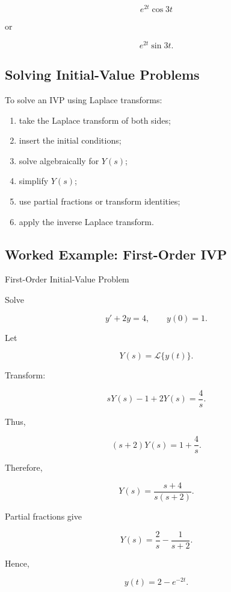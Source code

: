 \[
e^{2t}\cos3t
\]

or

\[
e^{2t}\sin3t.
\]

\subsection{Solving Initial-Value Problems}
\label{subsec:laplace-solving-ivps}

To solve an IVP using Laplace transforms:

\begin{enumerate}
    \item take the Laplace transform of both sides;
    \item insert the initial conditions;
    \item solve algebraically for \(Y(s)\);
    \item simplify \(Y(s)\);
    \item use partial fractions or transform identities;
    \item apply the inverse Laplace transform.
\end{enumerate}

\subsection{Worked Example: First-Order IVP}
\label{subsec:worked-laplace-first-order-ivp}

\begin{workedexamplebox}{First-Order Initial-Value Problem}

Solve

\[
y'+2y=4,
\qquad
y(0)=1.
\]

Let

\[
Y(s)
=
\mathcal{L}\{y(t)\}.
\]

Transform:

\[
sY(s)-1
+
2Y(s)
=
\frac4s.
\]

Thus,

\[
(s+2)Y(s)
=
1+\frac4s.
\]

Therefore,

\[
Y(s)
=
\frac{
s+4
}{
s(s+2)
}.
\]

Partial fractions give

\[
Y(s)
=
\frac2s
-
\frac1{s+2}.
\]

Hence,

\begin{answerbox}
\[
\boxed{
y(t)
=
2-e^{-2t}.
}
\]
\end{answerbox}

\end{workedexamplebox}

